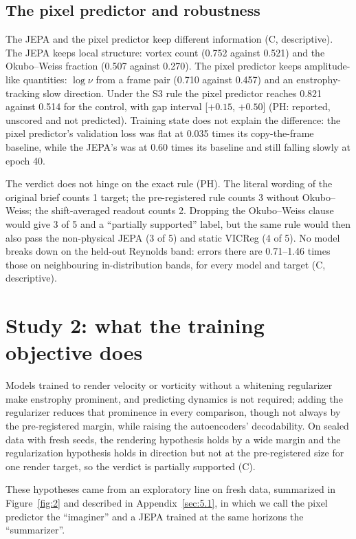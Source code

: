\documentclass[10pt]{article}
\begin{document}
\subsection{The pixel predictor and robustness}\label{sec:4.5}

The JEPA and the pixel predictor keep different information (C, descriptive). The JEPA keeps local structure: vortex count (0.752 against 0.521) and the Okubo--Weiss fraction (0.507 against 0.270). The pixel predictor keeps amplitude-like quantities: $\log\nu$ from a frame pair (0.710 against 0.457) and an enstrophy-tracking slow direction. Under the S3 rule the pixel predictor reaches 0.821 against 0.514 for the control, with gap interval [$+0.15$, $+0.50$] (PH: reported, unscored and not predicted). Training state does not explain the difference: the pixel predictor's validation loss was flat at 0.035 times its copy-the-frame baseline, while the JEPA's was at 0.60 times its baseline and still falling slowly at epoch 40.

The verdict does not hinge on the exact rule (PH). The literal wording of the original brief counts 1 target; the pre-registered rule counts 3 without Okubo--Weiss; the shift-averaged readout counts 2. Dropping the Okubo--Weiss clause would give 3 of 5 and a ``partially supported'' label, but the same rule would then also pass the non-physical JEPA (3 of 5) and static VICReg (4 of 5). No model breaks down on the held-out Reynolds band: errors there are 0.71--1.46 times those on neighbouring in-distribution bands, for every model and target (C, descriptive).

\section{Study 2: what the training objective does}\label{sec:5}

Models trained to render velocity or vorticity without a whitening regularizer make enstrophy prominent, and predicting dynamics is not required; adding the regularizer reduces that prominence in every comparison, though not always by the pre-registered margin, while raising the autoencoders' decodability. On sealed data with fresh seeds, the rendering hypothesis holds by a wide margin and the regularization hypothesis holds in direction but not at the pre-registered size for one render target, so the verdict is partially supported (C).

These hypotheses came from an exploratory line on fresh data, summarized in Figure~\ref{fig:2} and described in Appendix~\ref{sec:5.1}, in which we call the pixel predictor the ``imaginer'' and a JEPA trained at the same horizons the ``summarizer''.
\end{document}
